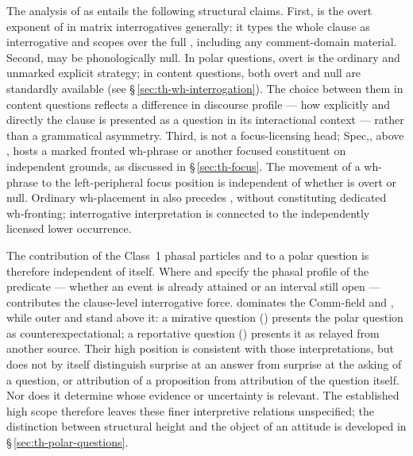 The analysis of  as  entails the following
structural claims. First,  is the overt exponent of 
in matrix interrogatives generally: it types the whole clause as interrogative
and scopes over the full , including any comment-domain material. Second,
 may be phonologically null. In polar questions, overt
 is the ordinary and unmarked explicit strategy; in content questions,
both overt  and null  are standardly available
(see §\,\ref{sec:th-wh-interrogation}). The choice between them in content
questions reflects a difference in discourse profile --- how explicitly and
directly the clause is presented as a question in its interactional context ---
rather than a grammatical asymmetry. Third,  is not a
focus-licensing head; Spec,, above , hosts
a marked fronted wh-phrase or another focused constituent on independent
grounds, as discussed in
§\,\ref{sec:th-focus}. The movement of a wh-phrase to the left-peripheral
focus position is independent of whether  is overt or
null. Ordinary wh-placement in  also precedes ,
without constituting dedicated wh-fronting; interrogative interpretation is
connected to the independently licensed lower occurrence.

The contribution of the Class~1 phasal particles  and  to a
polar question is therefore independent of  itself. Where 
and  specify the phasal profile of the predicate — whether an event
is already attained or an interval still open —  contributes the
clause-level interrogative force.  dominates the Comm-field
and , while outer  and
 stand above it: a mirative question
() presents the polar question as counterexpectational; a
reportative question () presents it as relayed from another
source. Their high position is consistent with those interpretations, but
does not by itself distinguish surprise at an answer from surprise at the
asking of a question, or attribution of a proposition from attribution of
the question itself. Nor does it determine whose evidence or uncertainty
is relevant. The established high scope therefore leaves these finer
interpretive relations unspecified; the distinction between structural
height and the object of an attitude is developed in
§\,\ref{sec:th-polar-questions}.

